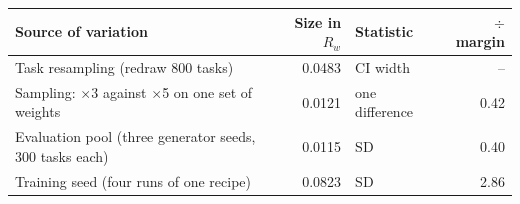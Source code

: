 \begin{tabular}{@{}lrlr@{}}
\toprule
Source of variation & Size in $R_w$ & Statistic & $\div$ margin \\
\midrule
Task resampling (redraw 800 tasks) & 0.0483 & CI width & -- \\
Sampling: $\times$3 against $\times$5 on one set of weights & 0.0121 & one difference & 0.42 \\
Evaluation pool (three generator seeds, 300 tasks each) & 0.0115 & SD & 0.40 \\
Training seed (four runs of one recipe) & 0.0823 & SD & 2.86 \\
\bottomrule
\end{tabular}
